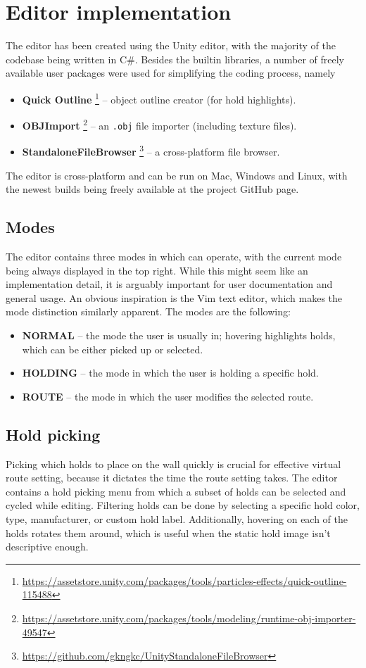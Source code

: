 \section{Editor implementation}
The editor has been created using the Unity editor, with the majority of the codebase being written in C\#.
Besides the builtin libraries, a number of freely available user packages were used for simplifying the coding process, namely

\begin{itemize}
	\item \textbf{Quick Outline} \footnote{\url{https://assetstore.unity.com/packages/tools/particles-effects/quick-outline-115488}} -- object outline creator (for hold highlights).
	\item \textbf{OBJImport} \footnote{\url{https://assetstore.unity.com/packages/tools/modeling/runtime-obj-importer-49547}} -- an \verb|.obj| file importer (including texture files).
	\item \textbf{StandaloneFileBrowser} \footnote{\url{https://github.com/gkngkc/UnityStandaloneFileBrowser}} -- a cross-platform file browser.
\end{itemize}

The editor is cross-platform and can be run on Mac, Windows and Linux, with the newest builds being freely available at the project GitHub page.

\subsection{Modes}
The editor contains three modes in which can operate, with the current mode being always displayed in the top right.
While this might seem like an implementation detail, it is arguably important for user documentation and general usage.
An obvious inspiration is the Vim text editor, which makes the mode distinction similarly apparent.
The modes are the following:

\begin{itemize}
		\item \textbf{NORMAL} -- the mode the user is usually in; hovering highlights holds, which can be either picked up or selected.
		\item \textbf{HOLDING} -- the mode in which the user is holding a specific hold.
		\item \textbf{ROUTE} -- the mode in which the user modifies the selected route.
\end{itemize}

\subsection{Hold picking}
Picking which holds to place on the wall quickly is crucial for effective virtual route setting, because it dictates the time the route setting takes.
The editor contains a hold picking menu from which a subset of holds can be selected and cycled while editing.
Filtering holds can be done by selecting a specific hold color, type, manufacturer, or custom hold label.
Additionally, hovering on each of the holds rotates them around, which is useful when the static hold image isn't descriptive enough.

